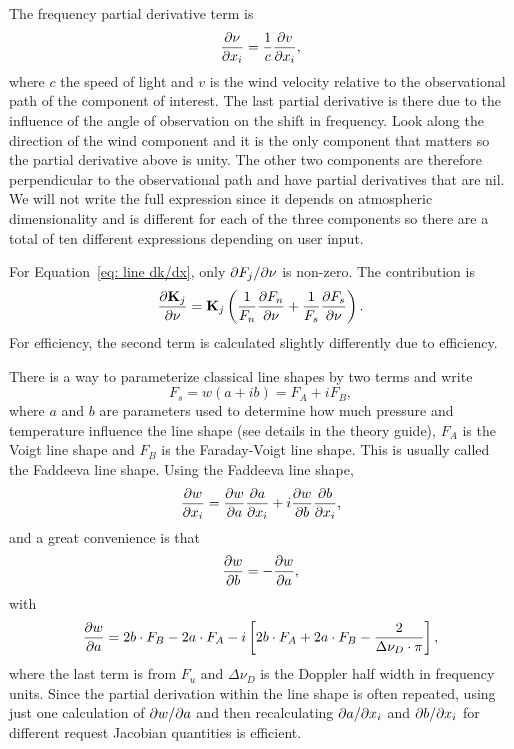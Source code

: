 The frequency partial derivative term is
\begin{equation}
  \frac{\partial \nu}{\partial x_i} = \frac{1}{c}\frac{\partial v}{\partial x_i},
\end{equation}
where $c$ the speed of light and $v$ is the wind velocity relative to the observational path of the component of interest.
The last partial derivative is there due to the influence of the angle of observation on the shift in frequency.
Look along the direction of the wind component and it is the only component that matters so 
the partial derivative above is unity.  The other two components are therefore perpendicular
to the observational path and have partial derivatives that are nil.  We will not write the full expression since it
depends on atmospheric dimensionality and is different for each of the three components so there are a total of 
ten different expressions depending on user input.

For Equation~\ref{eq: line dk/dx}, only ${\partial F_j}/{\partial \nu}$ is non-zero.
The contribution is
\begin{equation}
   \frac{\partial \mathbf{K}_j}{\partial \nu} = \mathbf{K}_j \left(\frac{1}{F_n}\frac{\partial F_n}{\partial \nu}+\frac{1}{F_s}\frac{\partial F_s}{\partial \nu}\right).
   \label{eq: wind propagation derivative}
\end{equation}
For efficiency, the second term is calculated slightly differently due to efficiency.

There is a way to parameterize classical line shapes by two terms and write
\begin{equation}
  F_s = w(a+ib) = F_A + iF_B,
\end{equation}
where $a$ and $b$ are parameters used to determine how much pressure and temperature influence the line shape 
(see details in the theory guide),
$F_A$ is the Voigt line shape and $F_B$ is the Faraday-Voigt line shape.
This is usually called the Faddeeva line shape.
Using the Faddeeva line shape,
\begin{equation}
  \frac{\partial w}{\partial x_i} = \frac{\partial w}{\partial a}\frac{\partial a}{\partial x_i}+i\frac{\partial w}{\partial b}\frac{\partial b}{\partial x_i},
  \label{eq: line shape derivative}
\end{equation}
and a great convenience is that 
\begin{equation}
  \frac{\partial w}{\partial b} = - \frac{\partial w}{\partial a},
\end{equation}
with
\begin{equation}
  \frac{\partial w}{\partial a} = 2b \cdot F_B-2a \cdot F_A - i \left[ 2b \cdot F_A+2a \cdot F_B-\frac{2}{\Delta\nu_D\cdot\pi} \right],
\end{equation}
where the last term is from $F_u$ and $\Delta\nu_D$ is the Doppler half width in frequency units.
Since the partial derivation within the line shape is often repeated, using just one calculation of $\partial w/\partial a$ 
and then recalculating ${\partial a}/{\partial x_i}$ and ${\partial b}/{\partial x_i}$ for different request Jacobian quantities
is efficient.

